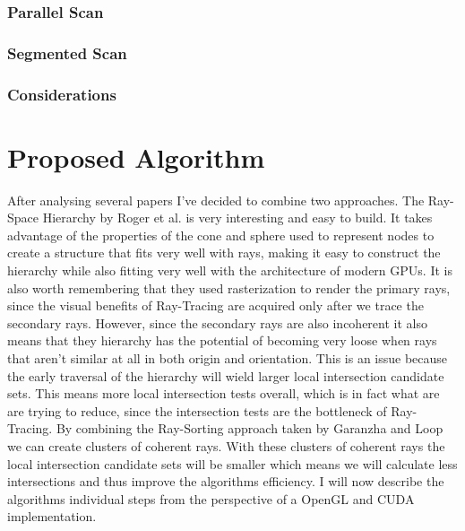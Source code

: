 \documentclass{llncs}
\begin{document}
\subsubsection{Parallel Scan}

\subsubsection{Segmented Scan}

\subsubsection{Considerations}


\newpage

%
\section{Proposed Algorithm}
%

After analysing several papers I've decided to combine two approaches. The Ray-Space Hierarchy by Roger et al. \cite{Roger07} is very interesting and easy to build. It takes advantage of the properties of the cone and sphere used to represent nodes to create a structure that fits very well with rays, making it easy to construct the hierarchy while also fitting very well with the architecture of modern GPUs. It is also worth remembering that they used rasterization to render the primary rays, since the visual benefits of Ray-Tracing are acquired only after we trace the secondary rays. However, since the secondary rays are also incoherent it also means that they hierarchy has the potential of becoming very loose when rays that aren't similar at all  in both origin and orientation. This is an issue because the early traversal of the hierarchy will wield larger local intersection candidate sets. This means more local intersection tests overall, which is in fact what are are trying to reduce, since the intersection tests are the bottleneck of Ray-Tracing. By combining the Ray-Sorting approach taken by Garanzha and Loop \cite{GaranzhaLoop10} we can create clusters of coherent rays. With these clusters of coherent rays the local intersection candidate sets will be smaller which means we will calculate less intersections and thus improve the algorithms efficiency. I will now describe the algorithms individual steps from the perspective of a OpenGL and CUDA implementation.
\end{document}
